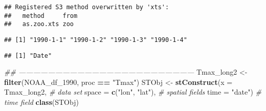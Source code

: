 \documentclass[]{book}
\newenvironment{Shaded}{\begin{snugshade}}{\end{snugshade}}
\newcommand{\CommentTok}[1]{\textcolor[rgb]{0.56,0.35,0.01}{\textit{#1}}}
\newcommand{\DataTypeTok}[1]{\textcolor[rgb]{0.13,0.29,0.53}{#1}}
\newcommand{\DecValTok}[1]{\textcolor[rgb]{0.00,0.00,0.81}{#1}}
\newcommand{\KeywordTok}[1]{\textcolor[rgb]{0.13,0.29,0.53}{\textbf{#1}}}
\newcommand{\NormalTok}[1]{#1}
\newcommand{\OperatorTok}[1]{\textcolor[rgb]{0.81,0.36,0.00}{\textbf{#1}}}
\newcommand{\StringTok}[1]{\textcolor[rgb]{0.31,0.60,0.02}{#1}}
\begin{document}
\begin{verbatim}
## Registered S3 method overwritten by 'xts':
##   method     from
##   as.zoo.xts zoo
\end{verbatim}

\begin{Shaded}
\end{Shaded}

\begin{verbatim}
## [1] "1990-1-1" "1990-1-2" "1990-1-3" "1990-1-4"
\end{verbatim}

\begin{Shaded}
\end{Shaded}

\begin{verbatim}
## [1] "Date"
\end{verbatim}

\begin{Shaded}
\begin{Highlighting}[]
\CommentTok{## ------------------------------------------------------------------------}
\NormalTok{Tmax_long2 <-}\StringTok{ }\KeywordTok{filter}\NormalTok{(NOAA_df_}\DecValTok{1990}\NormalTok{, proc }\OperatorTok{==}\StringTok{ "Tmax"}\NormalTok{)}
\NormalTok{STObj <-}\StringTok{ }\KeywordTok{stConstruct}\NormalTok{(}\DataTypeTok{x =}\NormalTok{ Tmax_long2,           }\CommentTok{# data set}
                    \DataTypeTok{space =} \KeywordTok{c}\NormalTok{(}\StringTok{"lon"}\NormalTok{, }\StringTok{"lat"}\NormalTok{),  }\CommentTok{# spatial fields}
                    \DataTypeTok{time =} \StringTok{"date"}\NormalTok{)            }\CommentTok{# time field}
\KeywordTok{class}\NormalTok{(STObj)}
\end{Highlighting}
\end{Shaded}
\end{document}
